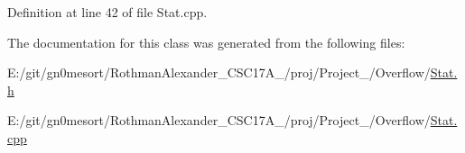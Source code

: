 Definition at line 42 of file Stat.\+cpp.



The documentation for this class was generated from the following files\+:\begin{DoxyCompactItemize}
\item 
E\+:/git/gn0mesort/\+Rothman\+Alexander\+\_\+\+C\+S\+C17\+A\+\_/proj/\+Project\+\_/\+Overflow/\hyperlink{_stat_8h}{Stat.\+h}\item 
E\+:/git/gn0mesort/\+Rothman\+Alexander\+\_\+\+C\+S\+C17\+A\+\_/proj/\+Project\+\_/\+Overflow/\hyperlink{_stat_8cpp}{Stat.\+cpp}\end{DoxyCompactItemize}
